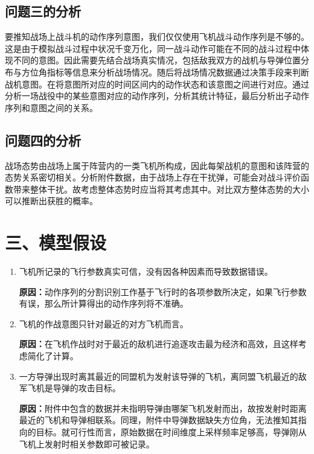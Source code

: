 \documentclass{my_paper}
\begin{document}
\subsection{问题三的分析}

要推知战场上战斗机的动作序列意图，我们仅仅使用飞机战斗动作序列是不够的。这是由于模拟战斗过程中状况千变万化，同一战斗动作可能在不同的战斗过程中体现不同的意图。因此需要先结合战场真实情况，包括敌我双方的战机与导弹位置分布与方位角指标等信息来分析战场情况。随后将战场情况数据通过决策手段来判断战机意图。在将意图所对应的时间区间内的动作状态和该意图之间进行对应。通过分析一场战役中的某些意图对应的动作序列，分析其统计特征，最后分析出子动作序列和意图之间的关系。

\subsection{问题四的分析}

战场态势由战场上属于阵营内的一类飞机所构成，因此每架战机的意图和该阵营的态势关系密切相关。分析附件数据，由于战场上存在干扰弹，可能会对战斗评价函数带来整体干扰。故考虑整体态势时应当将其考虑其中。对比双方整体态势的大小可以推断出获胜的概率。

\section{三、模型假设}
\begin{enumerate}
    \item 飞机所记录的飞行参数真实可信，没有因各种因素而导致数据错误。
    
    \textbf{原因：}动作序列的分割识别工作基于飞行时的各项参数所决定，如果飞行参数有误，那么所计算得出的动作序列将不准确。

    \item 飞机的作战意图只针对最近的对方飞机而言。
    
    \textbf{原因：}在飞机作战时对于最近的敌机进行追逐攻击最为经济和高效，且这样考虑简化了计算。
    
    \item 一方导弹出现时离其最近的同盟机为发射该导弹的飞机，离同盟飞机最近的敌军飞机是导弹的攻击目标。
    
    \textbf{原因：}附件中包含的数据并未指明导弹由哪架飞机发射而出，故按发射时距离最近的飞机和导弹相联系。同理，附件中导弹数据缺失方位角，无法推知其指向的目标。就可行性而言，原始数据在时间维度上采样频率足够高，导弹刚从飞机上发射时相关参数即可被记录。
\end{enumerate}
\end{document}
